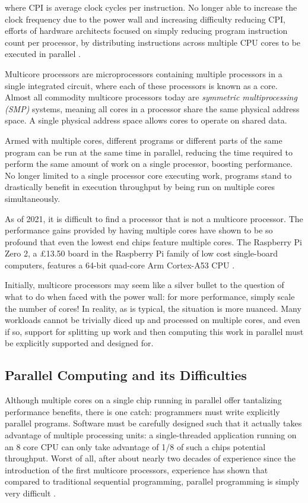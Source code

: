 \documentclass[bsc,frontabs,singlespacing,parskip,deptreport,normalheadings]{infthesis}
\begin{document}
where CPI is average clock cycles per instruction. No longer able to increase
the clock frequency due to the power wall and increasing difficulty reducing
CPI, efforts of hardware architects focused on simply reducing program
instruction count per processor, by distributing instructions across multiple
CPU cores to be executed in parallel \cite{etiemble_45-year_2018}.

Multicore processors are microprocessors containing multiple processors in a
single integrated circuit, where each of these processors is known as a core.
Almost all commodity multicore processors today are \textit{symmetric
multiprocessing (SMP)} systems, meaning all cores in a processor share the same
physical address space. A single physical address space allows cores to operate
on shared data.

Armed with multiple cores, different programs or different parts
of the same program can be run at the same time in parallel, reducing the time
required to perform the same amount of work on a single processor, boosting
performance. No longer limited to a single processor core executing work,
programs stand to drastically benefit in execution throughput by being run on
multiple cores simultaneously.

As of 2021, it is difficult to find a processor that is not a multicore
processor. The performance gains provided by having multiple cores have shown to
be so profound that even the lowest end chips feature multiple cores. The
Raspberry Pi Zero 2, a \pounds13.50 board in the Raspberry Pi family of low cost
single-board computers, features a 64-bit quad-core Arm Cortex-A53 CPU
\cite{ltd_raspberry_nodate}.

Initially, multicore processors may seem like a silver bullet to the question of
what to do when faced with the power wall: for more performance, simply scale
the number of cores! In reality, as is typical, the situation is more nuanced.
Many workloads cannot be trivially diced up and processed on multiple cores, and
even if so, support for splitting up work and then computing this work in
parallel must be explicitly supported and designed for.

\subsection{Parallel Computing and its Difficulties}
\label{section:parallel_computing}

Although multiple cores on a single chip running in parallel offer tantalizing
performance benefits, there is one catch: programmers must write explicitly
parallel programs. Software must be carefully designed such that it actually
takes advantage of multiple processing units: a single-threaded application
running on an 8 core CPU can only take advantage of 1/8 of such a chips
potential throughput. Worst of all, after about nearly two decades of experience
since the introduction of the first multicore processors, experience has shown
that compared to traditional sequential programming, parallel programming is
simply very difficult \cite{creeger_multicore_2005, lee_problem_2006,
patterson_trouble_2010}.
\end{document}
